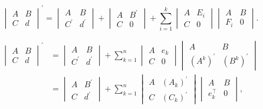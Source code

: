 \documentclass[10pt,a4paper]{amsart}
\begin{document}
\begin{equation} \label{dquasigrammian}
    \begin{vmatrix}
        A & B \\
        C & \boxed{d}
    \end{vmatrix}^{\prime} = 
    \begin{vmatrix} 
        A & B \\ 
        C^{\prime} & \boxed{d^{\prime}} 
    \end{vmatrix} + 
    \begin{vmatrix} 
        A & B^{\prime} \\ 
        C & \boxed{0} 
    \end{vmatrix} + \sum_{i=1}^{k} 
    \begin{vmatrix} 
        A & E_i \\ 
        C & \boxed{0} 
    \end{vmatrix} 
    \begin{vmatrix} 
        A & B \\ 
        F_i & \boxed{0} 
    \end{vmatrix}.
\end{equation}

\begin{equation} \label{dquasiwronskian}
    \begin{split}
    \begin{vmatrix}
        A & B \\
        C & \boxed{d}
    \end{vmatrix}^{\prime} 
    & = 
    \begin{vmatrix}
        A & B \\
        C^{\prime} & \boxed{d^{\prime}}
    \end{vmatrix} 
        + \sum_{k=1}^{n} \begin{vmatrix}
        A & e_k \\
        C & \boxed{0}
    \end{vmatrix} 
    \begin{vmatrix}
        A & B \\
        (A^k)^{\prime} & \boxed{(B^k)^{\prime}}
    \end{vmatrix} \\
    & =
    \begin{vmatrix}
        A & B^{\prime} \\
        C & \boxed{d^{\prime}}
    \end{vmatrix} 
        + \sum_{k=1}^{n} 
    \begin{vmatrix}
        A & (A_k)^{\prime} \\
        C & \boxed{(C_k)^{\prime}}
    \end{vmatrix} 
    \begin{vmatrix}
        A & B \\
        e_k^\top & \boxed{0}
    \end{vmatrix},
\end{split}
\end{equation}
\end{document}
